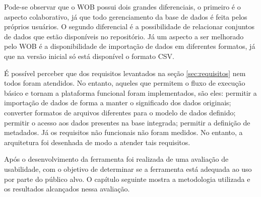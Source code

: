 Pode-se observar que o WOB possui dois grandes diferenciais, o primeiro é o aspecto colaborativo,
já que todo gerenciamento da base de dados é feita pelos próprios usuários. O segundo diferencial
é a possibilidade de relacionar conjuntos de dados que estão disponíveis no repositório. 
Já um aspecto a ser melhorado pelo WOB é a disponibilidade de importação de dados em 
diferentes formatos, já que na versão inicial só está disponível o formato CSV.

É possível perceber que dos requisitos levantados na seção \ref{sec:requisitos} nem todos foram
atendidos. No entanto, aqueles que permitem o fluxo de execução básico e tornam a plataforma
funcional foram implementados, são eles: permitir a importação de dados de forma a manter o
significado dos dados originais; converter formatos de arquivos diferentes para o modelo de dados
definido; permitir o acesso aos dados presentes na base integrada; permitir a definição de metadados. 
Já os requisitos não funcionais não foram medidos. No entanto, a arquitetura foi desenhada de modo
a atender tais requisitos.

Após o desenvolvimento da ferramenta foi realizada de uma avaliação de usabilidade,
com o objetivo de determinar se a ferramenta está adequada ao uso por parte do público alvo.
O capítulo seguinte mostra a metodologia utilizada e os resultados alcançados nessa avaliação.